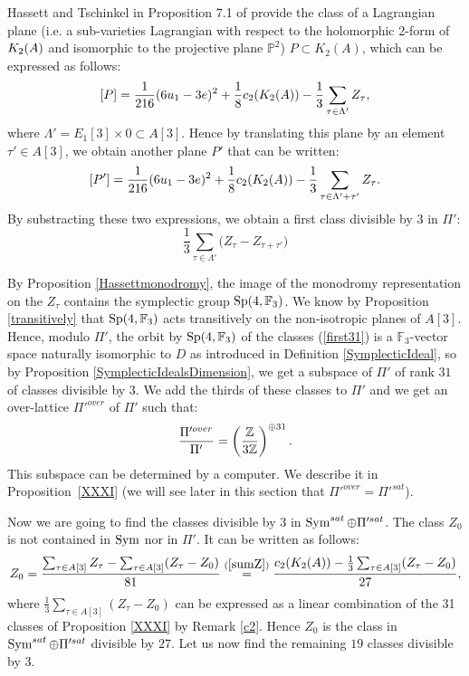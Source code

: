 Hassett and Tschinkel in Proposition 7.1 of \cite{Hassett} provide the class of a Lagrangian plane (i.e. a sub-varieties Lagrangian with respect to the holomorphic 2-form of $K_{ 2 }( A )$ and isomorphic to the projective plane $\mathbb{P}^2$) $P\subset K_2(A)$, which can be expressed as follows:
\begin{equation}
\left[P\right]=\frac{1}{216}(6u_1-3e)^2+\frac{1}{8}c_2(K_{ 2 }( A ))-\frac{1}{3}\sum_{\tau\in \Lambda'} Z_{\tau},
\label{LagrangianPlaneClass}
\end{equation}
where $\Lambda'=E_1[3]\times 0\subset A[3]$.
Hence by translating this plane by an element $\tau'\in A[3]$, we obtain another plane $P'$ that can be written:
$$\left[P'\right]=\frac{1}{216}(6u_1-3e)^2+\frac{1}{8}c_2(K_{ 2 }( A ))-\frac{1}{3}\sum_{\tau\in \Lambda'+\tau'} Z_{\tau}.$$
By substracting these two expressions, we obtain a first class divisible by 3 in $\Pi'$:
\begin{equation}
 \frac{1}{3}\sum_{\tau\in\Lambda'} \Big(Z_{\tau} - Z_{\tau+\tau'}\Big)
 \label{first31}
\end{equation}

By Proposition \ref{Hassettmonodromy}, the image of the monodromy representation on the $Z_\tau$ contains the symplectic group $\operatorname{Sp}(4,\mathbb F_3)$. 
We know by Proposition \ref{transitively} that $\operatorname{Sp}(4,\mathbb F_3)$ acts transitively on the non-isotropic planes of $A[3]$. Hence, modulo $\Pi'$, the orbit by $\operatorname{Sp}(4,\mathbb F_3)$ of the classes (\ref{first31}) is a $\mathbb F_3$-vector space naturally isomorphic to $D$ as introduced in Definition \ref{SymplecticIdeal}, so by Proposition \ref{SymplecticIdealsDimension}, we get a subspace of $\Pi'$ of rank $31$ of classes divisible by $3$.
We add the thirds of these classes to $\Pi'$ and we get an over-lattice $\Pi'^{over}$ of $\Pi'$ such that:
\begin{equation}
 \frac{\Pi'^{over}}{\Pi'}=\left(\frac{\mathbb{Z}}{3\mathbb{Z}}\right)^{\oplus 31}.
 \label{Piover}
\end{equation}
This subspace can be determined by a computer. We describe it in Proposition~\ref{XXXI} (we will see later in this section that $\Pi'^{over}=\Pi'^{sat}$).  

Now we are going to find the classes divisible by 3 in $\operatorname{Sym}^{sat}\oplus \Pi'^{sat}$.
The class $Z_0$ is not contained in $\operatorname{Sym}$ nor in $\Pi'$.
It can be written as follows:
$$
Z_0=\frac{\sum_{\tau\in A[3]}Z_\tau-\sum_{\tau\in A[3]}(Z_\tau-Z_0)}{81}
\stackrel{(\ref{sumZ})}{=} \frac{c_2(K_2(A))-\frac{1}{3}\sum_{\tau\in A[3]}(Z_\tau-Z_0)}{27},
$$
where $\frac{1}{3}\sum_{\tau\in A[3]}(Z_\tau-Z_0)$ can be expressed as a linear combination of the 31 classes of Proposition \ref{XXXI} by Remark \ref{c2}.
Hence $Z_0$ is the class in $\operatorname{Sym}^{sat}\oplus \Pi'^{sat}$ divisible by $27$. 
Let us now find the remaining $19$ classes divisible by $3$.


